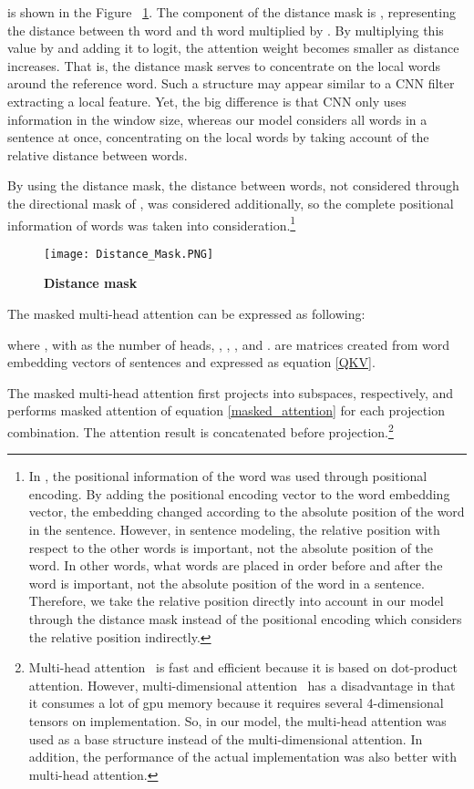 \documentclass[11pt,letterpaper]{article}
\begin{document}
 is shown in the Figure ~\ref{Distance_mask}. The  component of the distance mask is , representing the distance between th word and th word multiplied by . By multiplying this value by  and adding it to logit, the attention weight becomes smaller as distance increases. That is, the distance mask serves to concentrate on the local words around the reference word. Such a structure may appear similar to a CNN filter extracting a local feature. Yet, the big difference is that CNN only uses information in the window size, whereas our model considers all words in a sentence at once, concentrating on the local words by taking account of the relative distance between words. 

By using the distance mask, the distance between words, not considered through the directional mask of \citet{DiSAN}, was considered additionally, so the complete positional information of words was taken into consideration.\footnote[1]{In \citet{AttentionAYN}, the positional information of the word was used through positional encoding. By adding the positional encoding vector to the word embedding vector, the embedding changed according to the absolute position of the word in the sentence. However, in sentence modeling, the relative position with respect to the other words is important, not the absolute position of the word. In other words, what words are placed in order before and after the word is important, not the absolute position of the word in a sentence. Therefore, we take the relative position directly into account in our model through the distance mask instead of the positional encoding which considers the relative position indirectly.}

\begin{figure}[h]
\begin{center}
	\texttt{[image: Distance\_Mask.PNG]}    
\caption{\textbf{Distance mask}}
\label{Distance_mask}
\end{center}
\end{figure}

The masked multi-head attention can be expressed as following:


where , with  as the number of heads, , ,  , and  .   are matrices created from  word embedding vectors of sentences and expressed as equation \ref{QKV}.



The masked multi-head attention first projects  into  subspaces, respectively, and performs masked attention of equation \ref{masked_attention} for each  projection combination. The  attention result is concatenated before projection.\footnote[1]{Multi-head attention~\citep{AttentionAYN} is fast and efficient because it is based on dot-product attention. However, multi-dimensional attention~\citep{DiSAN} has a disadvantage in that it consumes a lot of gpu memory because it requires several 4-dimensional tensors on implementation. So, in our model, the multi-head attention was used as a base structure instead of the multi-dimensional attention. In addition, the performance of the actual implementation was also better with multi-head attention.}
\end{document}
